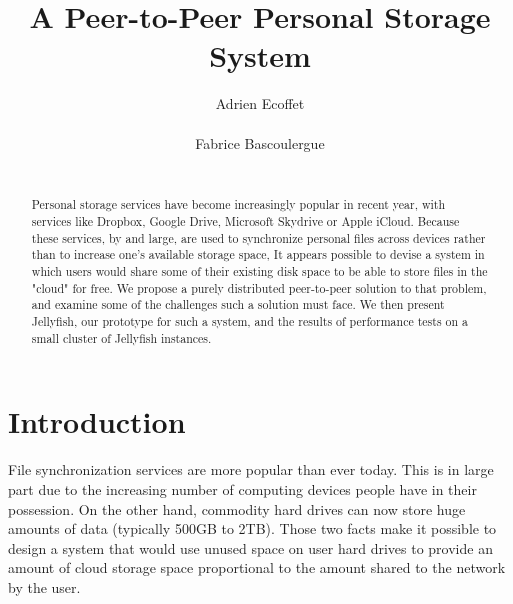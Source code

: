 \documentclass{acm_proc_article-sp}
\begin{document}
\title{A Peer-to-Peer Personal Storage System}
\subtitle{}



\author{
\alignauthor
Adrien Ecoffet\\
       \\
\alignauthor
Fabrice Bascoulergue\\
       \\
}

\maketitle
\begin{abstract}
Personal storage services have become increasingly popular in recent year, with services like Dropbox, Google Drive, Microsoft Skydrive or Apple iCloud\cite{dropbox, drive, skydrive, icloud}. Because these services, by and large, are used to synchronize personal files across devices rather than to increase one's available storage space, It appears possible to devise a system in which users would share some of their existing disk space to be able to store files in the "cloud" for free. We propose a purely distributed peer-to-peer solution to that problem, and examine some of the challenges such a solution must face. We then present Jellyfish, our prototype for such a system, and the results of performance tests on a small cluster of Jellyfish instances.
\end{abstract}

\section{Introduction}

File synchronization services are more popular than ever today. This is in large part due to the increasing number of computing devices people have in their possession. On the other hand, commodity hard drives can now store huge amounts of data (typically 500GB to 2TB). Those two facts make it possible to design a system that would use unused space on user hard drives to provide an amount of cloud storage space proportional to the amount shared to the network by the user. 
\end{document}
